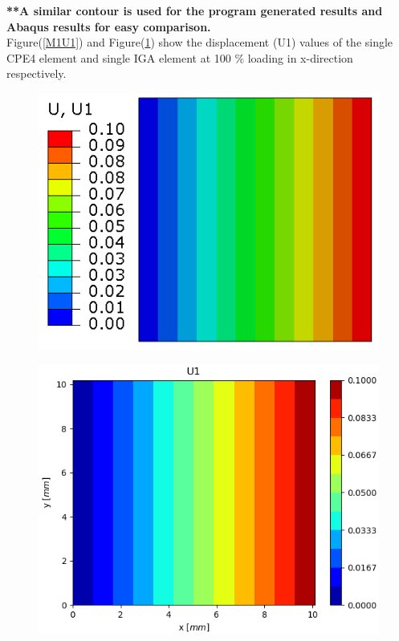 \documentclass[11pt]{article}
\begin{document}
\textbf{**A similar contour is used for the program generated results and Abaqus results for easy comparison. }\\
Figure(\ref{M1U1}) and Figure(\ref{M1U1_IGA}) show the displacement (U1) values of the single CPE4 element and single IGA element at 100 \% loading in x-direction respectively. \\
\begin{figure}[H]
	\centering
	\begin{minipage}{.5\textwidth}
		\centering
		\includegraphics[width=1\linewidth]{M1U1.png}
		\label{M1U1}
	\end{minipage}%
	\begin{minipage}{.5\textwidth}
		\centering
		\includegraphics[width=1\linewidth]{M1U1_IGA.png}
		\label{M1U1_IGA}
	\end{minipage}
\end{figure}
\end{document}
